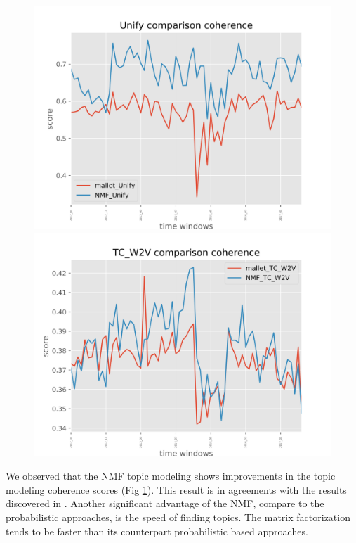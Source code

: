 \begin{figure}[!ht]
\centering
{}
\label{fig:topic_coherence}
\begin{minipage}{.5\linewidth}
  \includegraphics[width=\textwidth]{img/Unify_comparison_all_coherence_plot}
\end{minipage}\hfill
\begin{minipage}{.5\linewidth}
  \includegraphics[width=\textwidth]{img/TC_W2V_comparison_all_coherence_plot}
\end{minipage}
\end{figure}

We observed that the NMF topic modeling shows improvements in the topic modeling coherence scores (Fig \ref{fig:topic_coherence}). This result is in agreements with the results discovered in \cite{Greene2016}. Another significant advantage of the NMF, compare to the probabilistic approaches, is the speed of finding topics. The matrix factorization tends to be faster than its counterpart probabilistic based approaches.  



